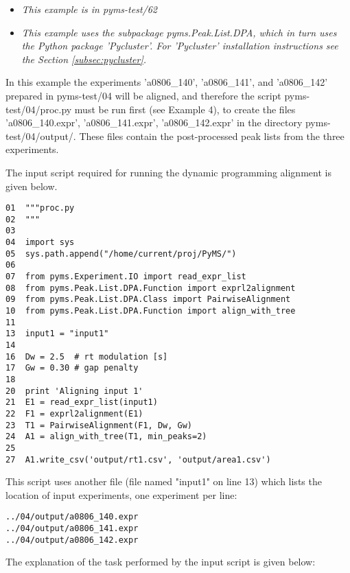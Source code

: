 \noindent
\begin{itemize}
\item {\em This example is in pyms-test/62}
\item {\em This example uses the subpackage pyms.Peak.List.DPA, which in turn uses
the Python package 'Pycluster'.  For 'Pycluster' installation instructions see the
Section \ref{subsec:pycluster}.}
\end{itemize}

In this example the experiments 'a0806\_140', 'a0806\_141', and 'a0806\_142'
prepared in pyms-test/04 will be aligned, and therefore the script
pyms-test/04/proc.py must be run first (see Example 4), to create the files
'a0806\_140.expr', 'a0806\_141.expr', 'a0806\_142.expr' in the directory
pyms-test/04/output/. These files contain the post-processed peak lists
from the three experiments. 

The input script required for running the dynamic programming alignment
is given below.

\begin{verbatim}
01  """proc.py
02  """
03 
04  import sys
05  sys.path.append("/home/current/proj/PyMS/")
06  
07  from pyms.Experiment.IO import read_expr_list
08  from pyms.Peak.List.DPA.Function import exprl2alignment
09  from pyms.Peak.List.DPA.Class import PairwiseAlignment
10  from pyms.Peak.List.DPA.Function import align_with_tree
11  
13  input1 = "input1"
14  
16  Dw = 2.5  # rt modulation [s]
17  Gw = 0.30 # gap penalty
18  
20  print 'Aligning input 1'
21  E1 = read_expr_list(input1)
22  F1 = exprl2alignment(E1)
23  T1 = PairwiseAlignment(F1, Dw, Gw)
24  A1 = align_with_tree(T1, min_peaks=2)
25  
27  A1.write_csv('output/rt1.csv', 'output/area1.csv')
\end{verbatim}

\noindent
This script uses another file (file named "input1" on line 13) which lists
the location of input experiments, one experiment per line:

\begin{verbatim}
../04/output/a0806_140.expr
../04/output/a0806_141.expr
../04/output/a0806_142.expr
\end{verbatim}

The explanation of the task performed by the input script is given below:

